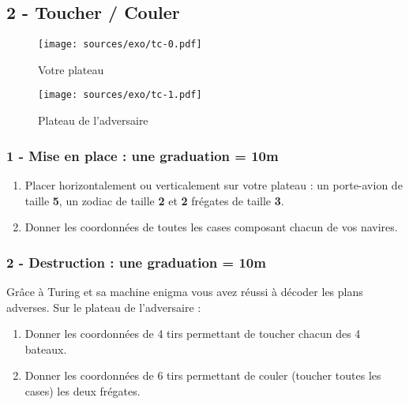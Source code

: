 \documentclass[11pt]{article}
\begin{document}
\subsection*{2 - Toucher / Couler}

\setlength{\columnseprule}{1pt}
\begin{multicols}{2}
\begin{figure}[H]
  \centering
  \texttt{[image: sources/exo/tc-0.pdf]}
  \caption{Votre plateau}
\end{figure}

\begin{figure}[H]
  \centering
  \texttt{[image: sources/exo/tc-1.pdf]}
  \caption{Plateau de l'adversaire}
\end{figure}
\end{multicols}  

\subsubsection*{1 - Mise en place : une graduation = 10m}
\begin{enumerate}
\item Placer horizontalement ou verticalement sur votre plateau : un porte-avion de taille \textbf{5}, un zodiac de taille \textbf{2} et \textbf{2} frégates de taille \textbf{3}.
\item Donner les coordonnées de toutes les cases composant chacun de vos navires.
\end{enumerate}

\subsubsection*{2 - Destruction  : une graduation = 10m}
Grâce à Turing et sa machine enigma vous avez réussi à décoder les plans adverses. Sur le plateau de l'adversaire : 
\begin{enumerate}
\item Donner les coordonnées de 4 tirs permettant de toucher chacun des 4 bateaux.
\item Donner les coordonnées de 6 tirs permettant de couler (toucher toutes les cases) les deux frégates.
\end{enumerate}
\end{document}
